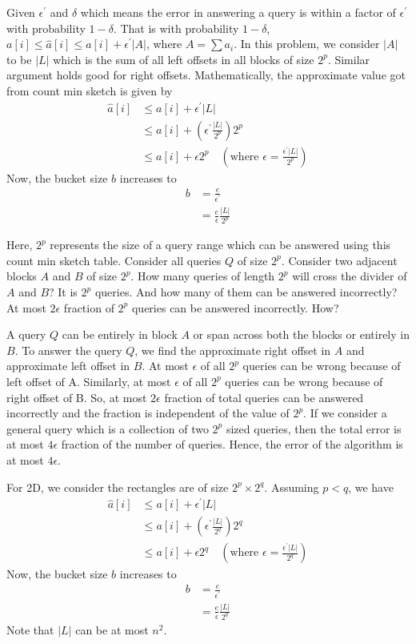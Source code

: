 \documentclass{article}
\begin{document}
Given $\epsilon^{\prime}$ and $\delta$ which means the error in answering a query is within a factor of $\epsilon^{\prime}$ with probability $1 - \delta$. That is with probability $1-\delta$, $a[i] \le \hat{a}[i] \le a[i] + \epsilon^{\prime} |A|$, where $A = \sum a_i$. In this problem, we consider $|A|$ to be $|L|$ which is the sum of all left offsets in all blocks of size $2^p$. Similar argument holds good for right offsets. Mathematically, the approximate value got from count min sketch is given by
\begin{align}
\hat{a}[i] &\le a[i] + \epsilon^{\prime} |L| \\
&\le a[i] + \left( \epsilon^{\prime} \frac{|L|}{2^p} \right) 2^p \\
&\le a[i] + \epsilon 2^p  \quad \left( \text{where } \epsilon =\frac{\epsilon^{\prime} |L|}{2^p} \right)
\end{align}
Now, the bucket size $b$ increases to
\begin{align}
b &= \frac{e}{\epsilon^{\prime}} \\
&= \frac{e}{\epsilon} \frac{|L|}{2^p}
\end{align}

Here, $2^p$ represents the size of a query range which can be answered using this count min sketch table. Consider all queries $Q$ of size $2^p$. Consider two adjacent blocks $A$ and $B$ of size $2^p$. How many queries of length $2^p$ will cross the divider of $A$ and $B$? It is $2^p$ queries. And how many of them can be answered incorrectly? At most $2 \epsilon$ fraction of $2^p$  queries can be answered incorrectly. How? 

A query $Q$ can be entirely in block $A$ or span across both the blocks or entirely in $B$. To answer the query $Q$, we find the approximate right offset in $A$ and approximate left offset in $B$. At most $\epsilon$ of all $2^p$ queries can be wrong because of left offset of A. Similarly, at most $\epsilon$ of all $2^p$ queries can be wrong because of right offset of B. So, at most $2 \epsilon$ fraction of total queries can be answered incorrectly and the fraction is independent of the value of $2^p$. If we consider a general query which is a collection of two $2^p$ sized queries, then the total error is at most $4 \epsilon$ fraction of the number of queries. Hence, the error of the algorithm is at most $4 \epsilon$.

For 2D, we consider the rectangles are of size $2^p \times 2^q$. Assuming $p < q$, we have
\begin{align}
\hat{a}[i] &\le a[i] + \epsilon^{\prime} |L| \\
&\le a[i] + \left( \epsilon^{\prime} \frac{|L|}{2^q} \right) 2^q  \\
&\le a[i] + \epsilon 2^q  \quad \left( \text{where } \epsilon =\frac{\epsilon^{\prime} |L|}{2^q} \right)
\end{align}
Now, the bucket size $b$ increases to
\begin{align}
b &= \frac{e}{\epsilon^{\prime}} \\
&= \frac{e}{\epsilon} \frac{|L|}{2^q}
\end{align}
Note that $|L|$ can be at most $n^2$.
\end{document}
